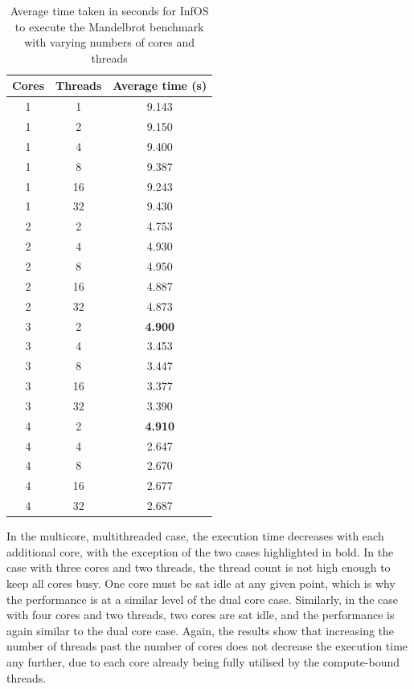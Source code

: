 \documentclass[bsc,frontabs,singlespacing,parskip,deptreport]{infthesis}
\begin{document}
\begin{table}[h]\centering
\normalsize
\begin{tabular}{ccc}\toprule
Cores & Threads & Average time (s) \\
\midrule
1 &1 &9.143 \\
\midrule
1 &2 &9.150 \\
1 &4 &9.400 \\
1 &8 &9.387 \\
1 &16 &9.243 \\
1 &32 &9.430 \\
\midrule
2 &2 &4.753 \\
2 &4 &4.930 \\
2 &8 &4.950 \\
2 &16 &4.887 \\
2 &32 &4.873 \\
\midrule
3 &2 &\textbf{4.900} \\
3 &4 &3.453 \\
3 &8 &3.447 \\
3 &16 &3.377 \\
3 &32 &3.390 \\
\midrule
4 &2 &\textbf{4.910} \\
4 &4 &2.647 \\
4 &8 &2.670 \\
4 &16 &2.677 \\
4 &32 &2.687 \\
\bottomrule
\end{tabular}
\caption{Average time taken in seconds for InfOS to execute the Mandelbrot benchmark with varying numbers of cores and threads}\label{timing-infos-mb}
\end{table}

In the multicore, multithreaded case, the execution time decreases with each additional core, with the exception of the two cases highlighted in bold. In the case with three cores and two threads, the thread count is not high enough to keep all cores busy. One core must be sat idle at any given point, which is why the performance is at a similar level of the dual core case. Similarly, in the case with four cores and two threads, two cores are sat idle, and the performance is again similar to the dual core case. Again, the results show that increasing the number of threads past the number of cores does not decrease the execution time any further, due to each core already being fully utilised by the compute-bound threads.
\end{document}
